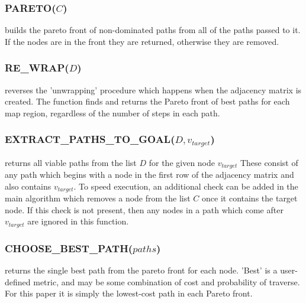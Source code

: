\documentclass[journal]{IEEEtran}
\newcounter{row}
\begin{document}
\subsubsection{PARETO($C$)} builds the pareto front of non-dominated paths from all of the paths passed to it. If the nodes are in the front they are returned, otherwise they are removed.
\subsubsection{RE\_WRAP($D$)} reverses the 'unwrapping' procedure which happens when the adjacency matrix is created. 
The function finds and returns the Pareto front of best paths for each map region, regardless of the number of steps in each path. 
\subsubsection{EXTRACT\_PATHS\_TO\_GOAL($D, v_{target}$)} returns all viable paths from the list $D$ for the given node $v_{target}$
These consist of any path which begins with a node in the first row of the adjacency matrix and also contains $v_{target}$. 
To speed execution, an additional check can be added in the main algorithm which removes a node from the list $C$ once it contains the target node. 
If this check is not present, then any nodes in a path which come after $v_{target}$ are ignored in this function.
\subsubsection{CHOOSE\_BEST\_PATH($paths$)} returns the single best path from the pareto front for each node. 'Best' is a user-defined metric, and may be some combination of cost and probability of traverse. For this paper it is simply the lowest-cost path in each Pareto front.
\end{document}

